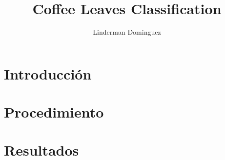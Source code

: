 \documentclass[10pt,letterpaper]{report}
\author{Linderman Dominguez}
\title{Coffee Leaves Classification}
\begin{document}
\chapter{Introducción}
\chapter{Procedimiento}
\chapter{Resultados}
\end{document}
